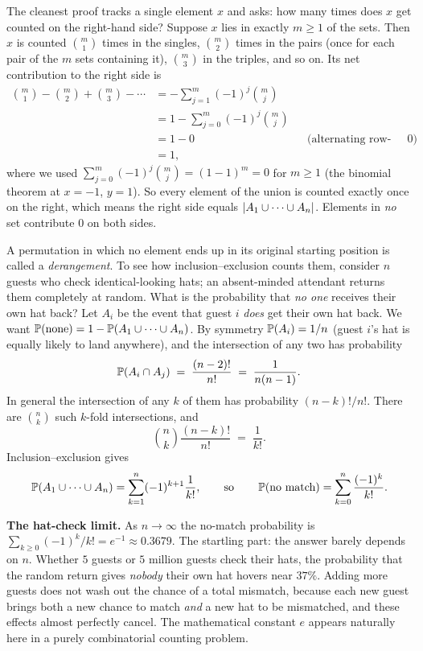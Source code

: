 \begin{whybox}
The cleanest proof tracks a single element $x$ and asks: how many times does $x$ get
counted on the right-hand side? Suppose $x$ lies in exactly $m \ge 1$ of the sets. Then $x$
is counted $\binom{m}{1}$ times in the singles, $\binom{m}{2}$ times in the pairs (once for
each pair of the $m$ sets containing it), $\binom{m}{3}$ in the triples, and so on. Its net
contribution to the right side is
\begin{align*}
  \binom{m}{1} - \binom{m}{2} + \binom{m}{3} - \cdots
  &= -\sum_{j=1}^{m} (-1)^{j}\binom{m}{j} \\
  &= 1 - \sum_{j=0}^{m} (-1)^{j}\binom{m}{j} \\
  &= 1 - 0 &&\text{(alternating row-sum is $0$)} \\
  &= 1,
\end{align*}
where we used $\sum_{j=0}^{m}(-1)^j\binom{m}{j} = (1-1)^m = 0$ for
$m \ge 1$ (the binomial theorem at $x=-1$, $y=1$). So every element of the union is counted
exactly once on the right, which means the right side equals $\abs{A_1\cup\cdots\cup A_n}$.
Elements in \emph{no} set contribute $0$ on both sides.
\end{whybox}

\begin{example}
\label{ch2:ex-derange}
A permutation in which no element ends up in its original starting position is called
a \emph{derangement}. To see how inclusion--exclusion counts them, consider $n$ guests who
check identical-looking hats; an absent-minded attendant returns them completely at
random. What is the probability that \emph{no one} receives their own hat back?
Let $A_i$ be the event that guest $i$ \emph{does} get their own hat back. We want
$\P(\text{none}) = 1 - \P(A_1 \cup \cdots \cup A_n)$. By symmetry $\P(A_i) = 1/n$
(guest $i$'s hat is equally likely to land anywhere), and the intersection of any two has probability
\[
  \P(A_i \cap A_j) \;=\; \frac{(n-2)!}{n!} \;=\; \frac{1}{n(n-1)}.
\]
In general the intersection of any $k$ of them has probability $(n-k)!/n!$. There
are $\binom{n}{k}$ such $k$-fold intersections, and
\[
  \binom{n}{k}\frac{(n-k)!}{n!} \;=\; \frac{1}{k!}.
\]
Inclusion--exclusion gives
\[
  \P(A_1\cup\cdots\cup A_n) = \sum_{k=1}^{n} (-1)^{k+1}\frac{1}{k!},
  \qquad\text{so}\qquad
  \P(\text{no match}) = \sum_{k=0}^{n}\frac{(-1)^k}{k!}.
\]
\end{example}

\begin{paradoxbox}
\textbf{The hat-check limit.} As $n \to \infty$ the no-match probability is
$\sum_{k\ge 0}(-1)^k/k! = e^{-1} \approx 0.3679$. The startling part: the answer barely
depends on $n$. Whether $5$ guests or $5$ million guests check their hats, the probability
that the random return gives \emph{nobody} their own hat hovers near $37\%$. Adding more
guests does not wash out the chance of a total mismatch, because each new guest brings both
a new chance to match \emph{and} a new hat to be mismatched, and these effects almost
perfectly cancel. The mathematical constant $e$ appears naturally here in a purely
combinatorial counting problem.
\end{paradoxbox}


